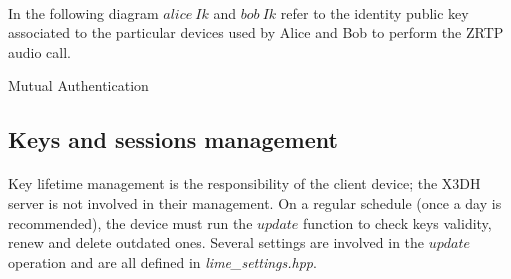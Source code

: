 \documentclass[a4paper,11pt]{article}
\begin{document}
    \paragraph{}In the following diagram $alice\ Ik$ and $bob\ Ik$ refer to the identity public key associated to the particular devices used by Alice and Bob to perform the ZRTP audio call.\\\newline
    \begin{msc}{Mutual Authentication}
    \setlength{\instdist}{9cm}
    \setlength{\envinstdist}{2.5cm}
    \nextlevel
    \nextlevel
    \nextlevel[3]
    \nextlevel
    \nextlevel[2]
    \nextlevel[3]
    \end{msc}

  \subsection{Keys and sessions management}
    \paragraph{}Key lifetime management is the responsibility of the client device; the X3DH server is not involved in their management. On a regular schedule (once a day is recommended), the device must run the $update$ function to check keys validity, renew and delete outdated ones. Several settings are involved in the $update$ operation and are all defined in \textit{lime\_settings.hpp}.
    
\end{document}
